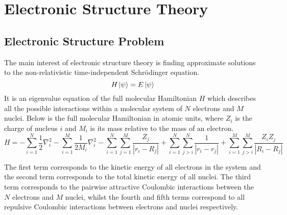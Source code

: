 \section{Electronic Structure Theory}

\subsection{Electronic Structure Problem}
The main interest of electronic structure theory is finding approximate solutions to the non-relativistic time-independent Schrödinger equation.
\begin{equation*}
    H\ket\psi = E\ket\psi
\end{equation*}
It is an eigenvalue equation of the full molecular Hamiltonian $H$ which describes all the possible interactions within a molecular system of $N$ electrons and $M$ nuclei. Below is the full molecular Hamiltonian in atomic units, where $Z_i$ is the charge of nucleus $i$ and $M_i$ is its mass relative to the mass of an electron.
\begin{equation*}
    H =
    - \sum_{i=1}^{N} \frac{1}{2} \nabla^{2}_{i}
    - \sum_{i=1}^{M} \frac{1}{2M_i} \nabla^{2}_{i}
    - \sum_{i=1}^{N} \sum_{j=1}^{M} \frac{Z_j}{|r_{i} - R_{j}|}
    + \sum_{i=1}^{N} \sum_{j>i}^{N} \frac{1}{|r_{i} - r_{j}|}
    + \sum_{i=1}^{M} \sum_{j>i}^{M} \frac{Z_{i} Z_{j}}{|R_{i} - R_{j}|}
\end{equation*}

The first term corresponds to the kinetic energy of all electrons in the system and the second term corresponds to the total kinetic energy of all nuclei. The third term corresponds to the pairwise attractive Coulombic interactions between the $N$ electrons and $M$ nuclei, whilst the fourth and fifth terms correspond to all repulsive Coulombic interactions between electrons and nuclei respectively.

